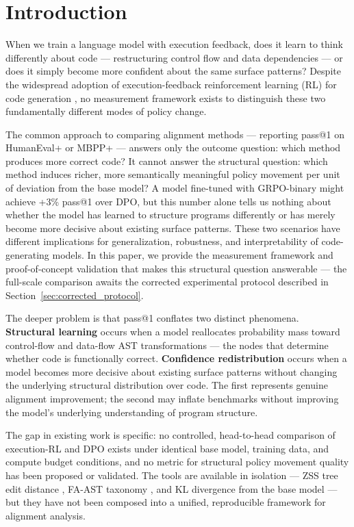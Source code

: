 \section{Introduction}

When we train a language model with execution feedback, does it learn to think
differently about code --- restructuring control flow and data dependencies --- or
does it simply become more confident about the same surface patterns? Despite
the widespread adoption of execution-feedback reinforcement learning (RL) for
code generation \cite{Le2022CodeRL,Shojaee2023Execution,Lambert2024TULU},
no measurement framework exists to distinguish these two fundamentally different
modes of policy change.

The common approach to comparing alignment methods --- reporting pass@1 on
HumanEval+ or MBPP+ --- answers only the outcome question: which method produces
more correct code? It cannot answer the structural question: which method induces
richer, more semantically meaningful policy movement per unit of deviation from
the base model? A model fine-tuned with GRPO-binary might achieve +3\% pass@1
over DPO, but this number alone tells us nothing about whether the model has
learned to structure programs differently or has merely become more decisive
about existing surface patterns. These two scenarios have different implications
for generalization, robustness, and interpretability of code-generating models.
In this paper, we provide the measurement framework and proof-of-concept validation
that makes this structural question answerable --- the full-scale comparison awaits
the corrected experimental protocol described in Section~\ref{sec:corrected_protocol}.

The deeper problem is that pass@1 conflates two distinct phenomena. \textbf{Structural
learning} occurs when a model reallocates probability mass toward control-flow
and data-flow AST transformations --- the nodes that determine whether code is
functionally correct. \textbf{Confidence redistribution} occurs when a model becomes
more decisive about existing surface patterns without changing the underlying
structural distribution over code. The first represents genuine alignment
improvement; the second may inflate benchmarks without improving the model's
underlying understanding of program structure.

The gap in existing work is specific: no controlled, head-to-head comparison of
execution-RL and DPO exists under identical base model, training data, and
compute budget conditions, and no metric for structural policy movement quality
has been proposed or validated. The tools are available in isolation --- ZSS tree
edit distance \cite{Zhang1989Simple}, FA-AST taxonomy \cite{Wang2020Detecting}, and
KL divergence from the base model --- but they have not been composed into a
unified, reproducible framework for alignment analysis.

